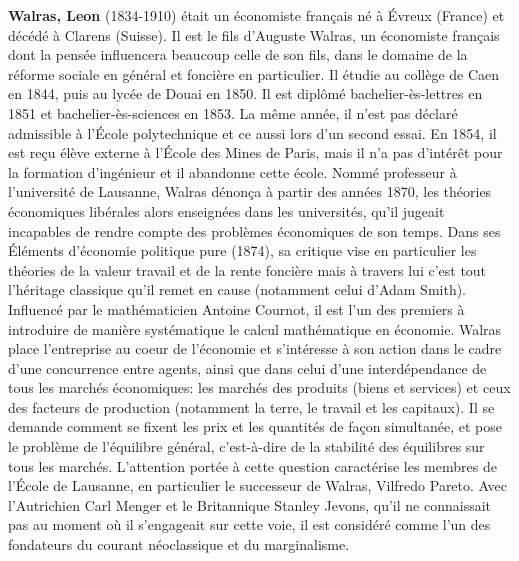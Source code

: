 \textbf{Walras, Leon} (1834-1910) était un économiste français né à Évreux (France) et décédé à Clarens (Suisse). Il est le fils d'Auguste Walras, un économiste français dont la pensée influencera beaucoup celle de son fils, dans le domaine de la réforme sociale en général et foncière en particulier. Il étudie au collège de Caen en 1844, puis au lycée de Douai en 1850. Il est diplômé bachelier-ès-lettres en 1851 et bachelier-ès-sciences en 1853. La même année, il n'est pas déclaré admissible à l'École polytechnique et ce aussi lors d'un second essai. En 1854, il est reçu élève externe à l'École des Mines de Paris, mais il n'a pas d’intérêt pour la formation d'ingénieur et il abandonne cette école. Nommé professeur à l'université de Lausanne, Walras dénonça à partir des années 1870, les théories économiques libérales alors enseignées dans les universités, qu'il jugeait incapables de rendre compte des problèmes économiques de son temps. Dans ses Éléments d'économie politique pure (1874), sa critique vise en particulier les théories de la valeur travail et de la rente foncière mais à travers lui c'est tout l'héritage classique qu'il remet en cause (notamment celui d'Adam Smith). Influencé par le mathématicien Antoine Cournot, il est l'un des premiers à introduire de manière systématique le calcul mathématique en économie. Walras place l'entreprise au coeur de l'économie et s'intéresse à son action dans le cadre d'une concurrence entre agents, ainsi que dans celui d'une interdépendance de tous les marchés économiques: les marchés des produits (biens et services) et ceux des facteurs de production (notamment la terre, le travail et les capitaux). Il se demande comment se fixent les prix et les quantités de façon simultanée, et pose le problème de l'équilibre général, c'est-à-dire de la stabilité des équilibres sur tous les marchés. L'attention portée à cette question caractérise les membres de l'École de Lausanne, en particulier le successeur de Walras, Vilfredo Pareto. Avec l'Autrichien Carl Menger et le Britannique Stanley Jevons, qu'il ne connaissait pas au moment où il s'engageait sur cette voie, il est considéré comme l'un des fondateurs du courant néoclassique et du marginalisme.

